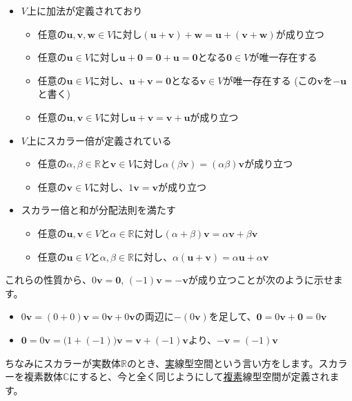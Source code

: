 \begin{itemize}
\item $V$上に加法が定義されており
\begin{itemize}
\item 任意の$\bm{u}, \bm{v}, \bm{w}\in V$に対し$(\bm{u} + \bm{v}) + \bm{w} = \bm{u} + (\bm{v} + \bm{w})$が成り立つ
\item 任意の$\bm{u}\in V$に対し$\bm{u} + \bm{0} = \bm{0} + \bm{u} = \bm{0}$となる$\bm{0}\in V$が唯一存在する
\item 任意の$\bm{u}\in V$に対し、$\bm{u} + \bm{v} = \bm{0}$となる$\bm{v}\in V$が唯一存在する (この$\bm{v}$を$-\bm{u}$と書く)
\item 任意の$\bm{u}, \bm{v}\in V$に対し$\bm{u} + \bm{v} = \bm{v} + \bm{u}$が成り立つ
\end{itemize}
\item $V$上にスカラー倍が定義されている
\begin{itemize}
\item 任意の$\alpha, \beta\in\mathbb{R}$と$\bm{v}\in V$に対し$\alpha(\beta\bm{v})=(\alpha\beta)\bm{v}$が成り立つ
\item 任意の$\bm{v}\in V$に対し、$1\bm{v}=\bm{v}$が成り立つ
\end{itemize}
\item スカラー倍と和が分配法則を満たす
\begin{itemize}
\item 任意の$\bm{u}, \bm{v}\in V$と$\alpha\in\mathbb{R}$に対し$(\alpha + \beta)\bm{v} = \alpha\bm{v} + \beta\bm{v}$
\item 任意の$\bm{u}\in V$と$\alpha,\beta\in\mathbb{R}$に対し、$\alpha(\bm{u} + \bm{v}) = \alpha\bm{u} + \alpha\bm{v}$
\end{itemize}
\end{itemize}

これらの性質から、$0\bm{v}=\bm{0}$, $(-1)\bm{v} = -\bm{v}$が成り立つことが次のように示せます。
\begin{itemize}
\item $0 \bm{v} = (0 + 0) \bm{v} = 0\bm{v} + 0\bm{v}$の両辺に$-(0\bm{v})$を足して、$\bm{0} = 0\bm{v} + \bm{0} = 0\bm{v}$
\item $\bm{0} = 0\bm{v} = \bigl(1 + (-1)\bigr)\bm{v} = \bm{v} + (-1) \bm{v}$より、$-\bm{v} = (-1)\bm{v}$
\end{itemize}

ちなみにスカラーが実数体$\mathbb{R}$のとき、\uline{実}線型空間という言い方をします。スカラーを複素数体$\mathbb{C}$にすると、今と全く同じようにして\uline{複素}線型空間が定義されます。

